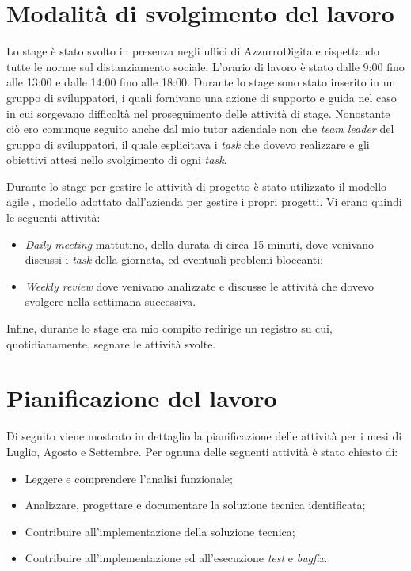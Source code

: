 \section{Modalità di svolgimento del lavoro}
Lo stage è stato svolto in presenza negli uffici di AzzurroDigitale rispettando tutte le norme sul distanziamento sociale. L'orario di lavoro è stato dalle 9:00 fino alle 13:00 e dalle 14:00 fino alle 18:00. Durante lo stage sono stato inserito in un gruppo di sviluppatori, i quali fornivano una azione di supporto e guida nel caso in cui sorgevano difficoltà nel proseguimento delle attività di stage. Nonostante ciò ero comunque seguito anche dal mio tutor aziendale non che \emph{team leader} del gruppo di sviluppatori, il quale esplicitava i \emph{task} che dovevo realizzare e gli obiettivi attesi nello svolgimento di ogni \emph{task}. 

Durante lo stage per gestire le attività di progetto è stato utilizzato il modello agile , modello adottato dall'azienda per gestire i propri progetti.
Vi erano quindi le seguenti attività:
\begin{itemize}
	\item \emph{Daily meeting} mattutino, della durata di circa 15 minuti, dove venivano discussi i \emph{task} della giornata, ed eventuali problemi bloccanti;
	\item \emph{Weekly review} dove venivano analizzate e discusse le attività che dovevo svolgere nella settimana successiva.
\end{itemize}

Infine, durante lo stage era mio compito redirige un registro su cui, quotidianamente, segnare le attività svolte.

\section{Pianificazione del lavoro}

Di seguito viene mostrato in dettaglio la pianificazione delle attività per i mesi di Luglio, Agosto e Settembre.
Per ognuna delle seguenti attività è stato chiesto di:
\begin{itemize}
	\item Leggere e comprendere l’analisi funzionale;
	\item Analizzare, progettare e documentare la soluzione tecnica identificata;
	\item Contribuire all’implementazione della soluzione tecnica;
	\item Contribuire all’implementazione ed all’esecuzione \emph{test} e \emph{bugfix}.
\end{itemize}


